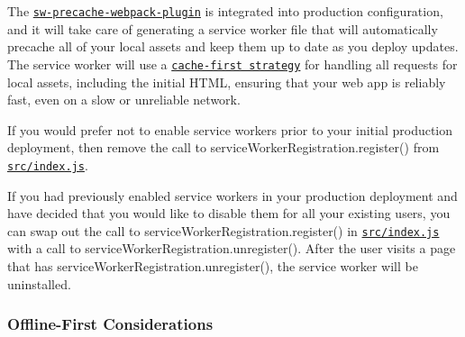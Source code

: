 The \href{https://github.com/goldhand/sw-precache-webpack-plugin}{\tt {\ttfamily sw-\/precache-\/webpack-\/plugin}} is integrated into production configuration, and it will take care of generating a service worker file that will automatically precache all of your local assets and keep them up to date as you deploy updates. The service worker will use a \href{https://developers.google.com/web/fundamentals/instant-and-offline/offline-cookbook/#cache-falling-back-to-network}{\tt cache-\/first strategy} for handling all requests for local assets, including the initial H\+T\+ML, ensuring that your web app is reliably fast, even on a slow or unreliable network.

If you would prefer not to enable service workers prior to your initial production deployment, then remove the call to {\ttfamily service\+Worker\+Registration.\+register()} from \href{src/index.js}{\tt {\ttfamily src/index.\+js}}.

If you had previously enabled service workers in your production deployment and have decided that you would like to disable them for all your existing users, you can swap out the call to {\ttfamily service\+Worker\+Registration.\+register()} in \href{src/index.js}{\tt {\ttfamily src/index.\+js}} with a call to {\ttfamily service\+Worker\+Registration.\+unregister()}. After the user visits a page that has {\ttfamily service\+Worker\+Registration.\+unregister()}, the service worker will be uninstalled.

\subsubsection*{Offline-\/\+First Considerations}


